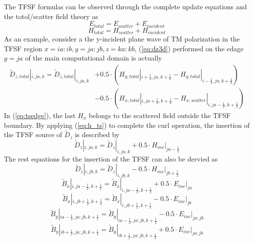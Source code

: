 The TFSF formulas can be observed through the complete update equations and the totol/scatter field theory as
\begin{equation}\label{eq:e_ts}
  E_{total}=E_{scatter}+E_{incident}
\end{equation}
\begin{equation}\label{eq:h_ts}
  H_{total}=H_{scatter}+H_{incident}  
\end{equation}
As an example, consider a the y-incident plane wave of TM polarization in the TFSF region $x=ia:ib, y=ja:jb, z=ka:kb$,
(\ref{eq:dz3d}) performed on the edage $y=ja$ of the main computational domain is actually
\begin{equation}\label{eq:tsedge}
  \begin{split}
    \widetilde{D}_{z,total}|_{i,ja,k} = \widetilde{D}_{z,total}|_{i,ja,k} &+ 0.5 \cdot \left( H_{y,total}|_{i+\frac{1}{2},ja,k+\frac{1}{2}} - H_{y,total}|_{i-\frac{1}{2},ja,k+\frac{1}{2}} \right) \\
    &- 0.5 \cdot \left( H_{x,total}|_{i,ja+\frac{1}{2},k+\frac{1}{2}} - H_{x,scatter}|_{i,ja-\frac{1}{2},k+\frac{1}{2}} \right)    
  \end{split}
\end{equation}
In (\ref{eq:tsedge}), the last $H_x$ belongs to the scattered field outside the TFSF boundary. By applying
(\ref{eq:h_ts}) to complete the curl operation, the insertion of the TFSF source of $\widetilde{D}_z$ is described by
\begin{displaymath}
  \widetilde{D}_z|_{i,ja,k} = \widetilde{D}_z|_{i,ja,k} + 0.5 \cdot H_{inc}|_{ja-\frac{1}{2}}
\end{displaymath}
The rest equations for the insertion of the TFSF can also be dervied as
\begin{displaymath}
  \widetilde{D}_z|_{i,jb,k} = \widetilde{D}_z|_{i,jb,k} - 0.5 \cdot H_{inc}|_{jb+\frac{1}{2}}  
\end{displaymath}
\begin{displaymath}
  \widetilde{B}_x|_{i,ja-\frac{1}{2},k+\frac{1}{2}}=\widetilde{B}_x|_{i,ja-\frac{1}{2},k+\frac{1}{2}}+0.5 \cdot E_{inc}|_{ja}
\end{displaymath}
\begin{displaymath}
  \widetilde{B}_x|_{i,jb+\frac{1}{2},k+\frac{1}{2}}=\widetilde{B}_x|_{i,jb+\frac{1}{2},k+\frac{1}{2}}-0.5 \cdot E_{inc}|_{jb}
\end{displaymath}
\begin{displaymath}
  \widetilde{B}_y|_{ia-\frac{1}{2},ja:jb,k+\frac{1}{2}}=\widetilde{B}_y|_{ia-\frac{1}{2},ja:jb,k+\frac{1}{2}}-0.5 \cdot E_{inc}|_{ja:jb}
\end{displaymath}
\begin{displaymath}
  \widetilde{B}_y|_{ib+\frac{1}{2},ja:jb,k+\frac{1}{2}}=\widetilde{B}_y|_{ib+\frac{1}{2},ja:jb,k+\frac{1}{2}}+0.5 \cdot E_{inc}|_{ja:jb}
\end{displaymath}






